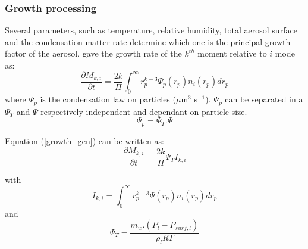 \subsubsection*{Growth processing}
Several parameters, such as temperature, relative humidity, total aerosol surface and 
the condensation matter rate determine which one is the principal growth factor 
of the aerosol.  
\citet{Whitby1991} gave the growth rate of the $k^{th}$ moment relative to $i$ 
mode as:
\begin{equation}
\frac{\partial M_{k,i}}{\partial t} = \frac{2 k}{\Pi} \int_{0}^{\infty} r_p^{k-
3} \Psi_p(r_p)n_i(r_p) dr_p
\label{growth_gen}
\end{equation}
where $\Psi_p$ is the condensation law on particles ($\mu$m$^3$ s$^{-1}$). $\Psi_p$ 
can be separated in a $\Psi_T$ and $\Psi$ respectively independent and dependant 
on particle size.
\begin{equation}
\Psi_p = \Psi_T . \Psi
\label{psi}
\end{equation}

Equation (\ref{growth_gen}) can be written as:
\begin{equation}
\frac{\partial M_{k,i}}{\partial t} = \frac{2 k}{\Pi} \Psi_T I_{k,i}
\label{growth_sec}
\end{equation}

with 
\begin{equation}
I_{k,i} = \int_{0}^{\infty} r_p^{k-3} \Psi(r_p) n_i(r_p) dr_p
\label{ik}
\end{equation}
and 
\begin{equation}
\Psi_T = \frac{m_w . (P_l - P_{surf,l})}{\rho_l R T}
\label{psit}
\end{equation}

